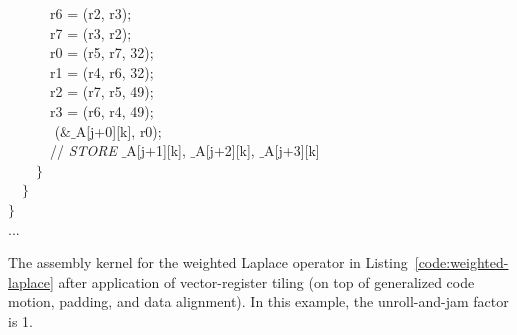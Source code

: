 \begin{algorithm}
~~~~~~r6 =  (r2, r3);\\
~~~~~~r7 =  (r3, r2);\\
~~~~~~r0 =  (r5, r7, 32);\\
~~~~~~r1 =  (r4, r6, 32);\\
~~~~~~r2 =  (r7, r5, 49);\\
~~~~~~r3 =  (r6, r4, 49);\\
~~~~~~ ($\&\_$A[j+0][k], r0);\\
~~~~~~// \emph{STORE} $\_$A[j+1][k], $\_$A[j+2][k], $\_$A[j+3][k]\\
~~~~$\rbrace$\\
~~$\rbrace$\\
$\rbrace$\\
...
\caption{The assembly kernel for the weighted Laplace operator in Listing~\ref{code:weighted-laplace} after application of vector-register tiling (on top of generalized code motion, padding, and data alignment). In this example, the unroll-and-jam factor is 1.}
\label{code:weighted-laplace-opvect}
\end{algorithm}

